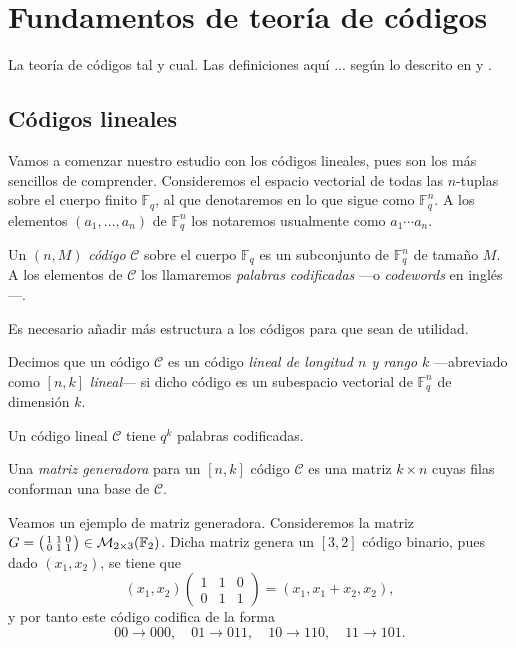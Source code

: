 \chapter{Fundamentos de teoría de códigos}

La teoría de códigos tal y cual. Las definiciones aquí ... según lo descrito en \parencite[1-48]{huffman_fundamentals_2003} y \parencite{podesta_introduccion_2006}.

\section{Códigos lineales}

Vamos a comenzar nuestro estudio con los códigos lineales, pues son los más sencillos de comprender. Consideremos el espacio vectorial de todas las \(n\)-tuplas sobre el cuerpo finito \(\mathbb F_q\), al que denotaremos en lo que sigue como \(\mathbb F_q^n\). A los elementos \((a_1, \dots, a_n)\) de \(\mathbb F_q^n\) los notaremos usualmente como \(a_1\!\cdots a_n\).

\begin{definition}
  Un \((n, M)\) \textit{código} \(\mathcal C\) sobre el cuerpo \(\mathbb F_q\) es un subconjunto de \(\mathbb F_q^n\) de tamaño \(M\). A los elementos de \(\mathcal C\) los llamaremos \textit{palabras codificadas} —o \textit{codewords} en inglés—.
\end{definition}

Es necesario añadir más estructura a los códigos para que sean de utilidad.

\begin{definition}
  Decimos que un código \(\mathcal C\) es un código \textit{lineal de longitud \(n\) y rango \(k\)} —abreviado como \([n, k]\) \textit{lineal}— si dicho código es un subespacio vectorial de \(\mathbb F_q^n\) de dimensión \(k\).
\end{definition}

Un código lineal \(\mathcal C\) tiene \(q^k\) palabras codificadas.

\begin{definition}
  Una \textit{matriz generadora} para un \([n, k]\) código \(\mathcal C\) es una matriz \(k \times n\) cuyas filas conforman una base de \(\mathcal C\).
\end{definition}

Veamos un ejemplo de matriz generadora. Consideremos la matriz \(G = \begin{psmallmatrix}
  1 & 1 & 0 \\ 0 & 1 & 1
\end{psmallmatrix} \in \mathcal M_{2 \times 3}(\mathbb F_2)\). Dicha matriz genera un \([3, 2]\) código binario, pues dado \((x_1, x_2)\), se tiene que \[(x_1, x_2) \begin{pmatrix}
  1 & 1 & 0 \\ 0 & 1 & 1
\end{pmatrix} = (x_1, x_1 + x_2, x_2),\] y por tanto este código codifica de la forma \[00 \to 000, \quad 01 \to 011,\quad 10 \to 110,\quad 11 \to 101.\]

